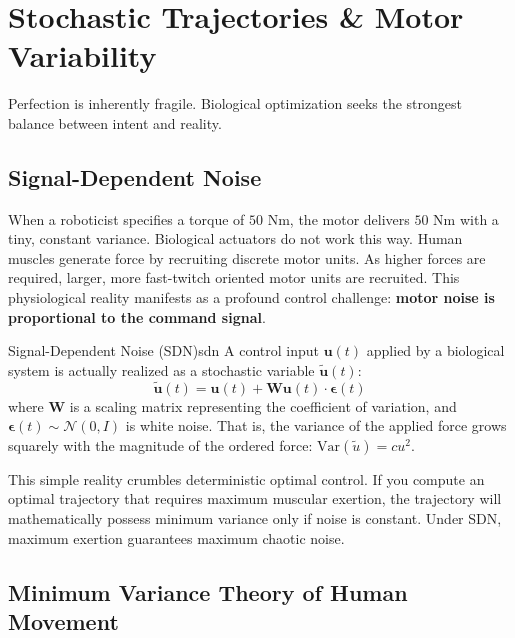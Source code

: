 \documentclass[12pt, openany]{book}
\theoremstyle{plain}
\newcommand{\control}{\bm{u}}
\begin{document}
\setcounter{chapter}{8}

\chapter{Stochastic Trajectories \& Motor Variability}

\epigraph{%
  Perfection is inherently fragile. Biological optimization seeks the strongest balance between intent and reality.
}{}

\vspace{0.5cm}

\section{Signal-Dependent Noise}

When a roboticist specifies a torque of $50\text{ Nm}$, the motor delivers $50\text{ Nm}$ with a tiny, constant variance. Biological actuators do not work this way. Human muscles generate force by recruiting discrete motor units. As higher forces are required, larger, more fast-twitch oriented motor units are recruited. This physiological reality manifests as a profound control challenge: \textbf{motor noise is proportional to the command signal}.

\begin{definition}{Signal-Dependent Noise (SDN)}{sdn}
  A control input $\control(t)$ applied by a biological system is actually realized as a stochastic variable $\tilde{\control}(t)$:
  \begin{equation}
    \tilde{\control}(t) = \control(t) + \bm{W} \control(t) \cdot \bm{\epsilon}(t)
  \end{equation}
  where $\bm{W}$ is a scaling matrix representing the coefficient of variation, and $\bm{\epsilon}(t) \sim \mathcal{N}(0, I)$ is white noise. That is, the variance of the applied force grows squarely with the magnitude of the ordered force: $\text{Var}(\tilde{u}) = c u^2$.
\end{definition}

This simple reality crumbles deterministic optimal control. If you compute an optimal trajectory that requires maximum muscular exertion, the trajectory will mathematically possess minimum variance only if noise is constant. Under SDN, maximum exertion guarantees maximum chaotic noise.

\section{Minimum Variance Theory of Human Movement}
\end{document}
